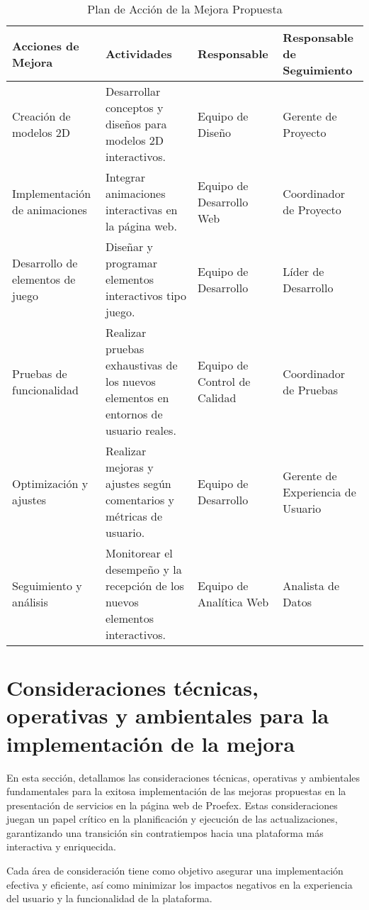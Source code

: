 \begin{table}[ht]
\centering
\begin{tabular}{|m{3cm}|m{4cm}|m{3cm}|m{4cm}|}
\hline
\textbf{Acciones de Mejora} & \textbf{Actividades} & \textbf{Responsable} & \textbf{Responsable de Seguimiento} \\
\hline
Creación de modelos 2D & Desarrollar conceptos y diseños para modelos 2D interactivos. & Equipo de Diseño & Gerente de Proyecto \\
\hline
Implementación de animaciones & Integrar animaciones interactivas en la página web. & Equipo de Desarrollo Web & Coordinador de Proyecto \\
\hline
Desarrollo de elementos de juego & Diseñar y programar elementos interactivos tipo juego. & Equipo de Desarrollo & Líder de Desarrollo \\
\hline
Pruebas de funcionalidad & Realizar pruebas exhaustivas de los nuevos elementos en entornos de usuario reales. & Equipo de Control de Calidad & Coordinador de Pruebas \\
\hline
Optimización y ajustes & Realizar mejoras y ajustes según comentarios y métricas de usuario. & Equipo de Desarrollo & Gerente de Experiencia de Usuario \\
\hline
Seguimiento y análisis & Monitorear el desempeño y la recepción de los nuevos elementos interactivos. & Equipo de Analítica Web & Analista de Datos \\
\hline
\end{tabular}
\caption{Plan de Acción de la Mejora Propuesta}
\end{table}

\section{Consideraciones técnicas, operativas y ambientales para la implementación de la mejora}

En esta sección, detallamos las consideraciones técnicas, operativas y ambientales fundamentales para la exitosa implementación de las mejoras propuestas en la presentación de servicios en la página web de Proefex. Estas consideraciones juegan un papel crítico en la planificación y ejecución de las actualizaciones, garantizando una transición sin contratiempos hacia una plataforma más interactiva y enriquecida.

Cada área de consideración tiene como objetivo asegurar una implementación efectiva y eficiente, así como minimizar los impactos negativos en la experiencia del usuario y la funcionalidad de la plataforma.

